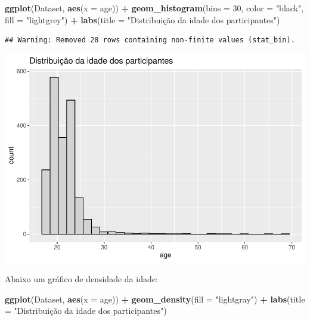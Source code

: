 \documentclass[
]{book}
\newenvironment{Shaded}{\begin{snugshade}}{\end{snugshade}}
\newcommand{\DataTypeTok}[1]{\textcolor[rgb]{0.13,0.29,0.53}{#1}}
\newcommand{\DecValTok}[1]{\textcolor[rgb]{0.00,0.00,0.81}{#1}}
\newcommand{\KeywordTok}[1]{\textcolor[rgb]{0.13,0.29,0.53}{\textbf{#1}}}
\newcommand{\NormalTok}[1]{#1}
\newcommand{\OperatorTok}[1]{\textcolor[rgb]{0.81,0.36,0.00}{\textbf{#1}}}
\newcommand{\StringTok}[1]{\textcolor[rgb]{0.31,0.60,0.02}{#1}}
\begin{document}
\begin{Shaded}
\begin{Highlighting}[]
\KeywordTok{ggplot}\NormalTok{(Dataset, }\KeywordTok{aes}\NormalTok{(}\DataTypeTok{x =}\NormalTok{ age)) }\OperatorTok{+}
\StringTok{  }\KeywordTok{geom_histogram}\NormalTok{(}\DataTypeTok{bins =} \DecValTok{30}\NormalTok{, }\DataTypeTok{color =} \StringTok{"black"}\NormalTok{, }\DataTypeTok{fill =} \StringTok{"lightgrey"}\NormalTok{) }\OperatorTok{+}
\StringTok{  }\KeywordTok{labs}\NormalTok{(}\DataTypeTok{title =} \StringTok{"Distribuição da idade dos participantes"}\NormalTok{)}
\end{Highlighting}
\end{Shaded}

\begin{verbatim}
## Warning: Removed 28 rows containing non-finite values (stat_bin).
\end{verbatim}

\begin{center}\includegraphics{gitbook-demo_files/figure-latex/unnamed-chunk-16-1} \end{center}

Abaixo um gráfico de densidade da idade:

\begin{Shaded}
\begin{Highlighting}[]
\KeywordTok{ggplot}\NormalTok{(Dataset, }\KeywordTok{aes}\NormalTok{(}\DataTypeTok{x =}\NormalTok{ age)) }\OperatorTok{+}
\StringTok{  }\KeywordTok{geom_density}\NormalTok{(}\DataTypeTok{fill =} \StringTok{"lightgray"}\NormalTok{) }\OperatorTok{+}
\StringTok{  }\KeywordTok{labs}\NormalTok{(}\DataTypeTok{title =} \StringTok{"Distribuição da idade dos participantes"}\NormalTok{)}
\end{Highlighting}
\end{Shaded}
\end{document}
